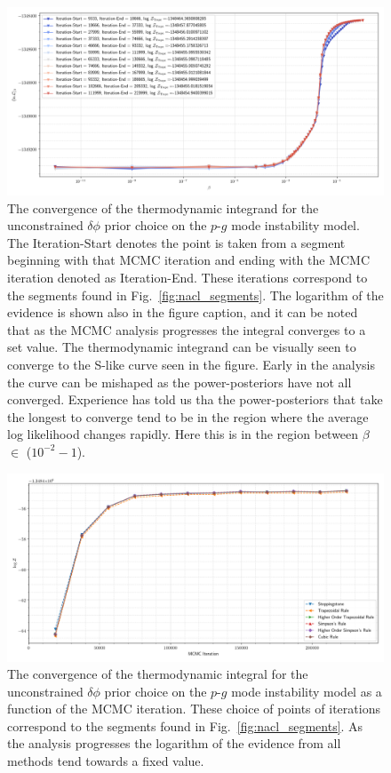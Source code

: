 \begin{figure}[th]
\centering
\includegraphics[width=0.9\columnwidth]{figs/chapter6/lsc_sim_integrand_progress.png}
\caption{The convergence of the thermodynamic integrand for the unconstrained $\delta \phi$ prior choice on the $p$-$g$ mode instability model. The Iteration-Start denotes the point is taken from a segment beginning with that MCMC iteration and ending with the MCMC iteration denoted as Iteration-End. These iterations correspond to the segments found in Fig.~\ref{fig:nacl_segments}. The logarithm of the evidence is shown also in the figure caption, and it can be noted that as the MCMC analysis progresses the integral converges to a set value. The thermodynamic integrand can be visually seen to converge to the S-like curve seen in the figure. Early in the analysis the curve can be mishaped as the power-posteriors have not all converged. Experience has told us tha the power-posteriors that take the longest to converge tend to be in the region where the average log likelihood changes rapidly. Here this is in the region between $\beta$ $\in$ ($10^{-2} - 1$).}
\label{fig:integrand_convergence}
\end{figure}

\begin{figure}[th]
\centering
\includegraphics[width=0.9\columnwidth]{figs/chapter6/lvc_sim_evidence_convergence.png}
\caption{The convergence of the thermodynamic integral for the unconstrained $\delta \phi$ prior choice on the $p$-$g$ mode instability model as a function of the MCMC iteration. These choice of points of iterations correspond to the segments found in Fig.~\ref{fig:nacl_segments}. As the analysis progresses the logarithm of the evidence from all methods tend towards a fixed value.}
\label{fig:integral_convergence}
\end{figure}

